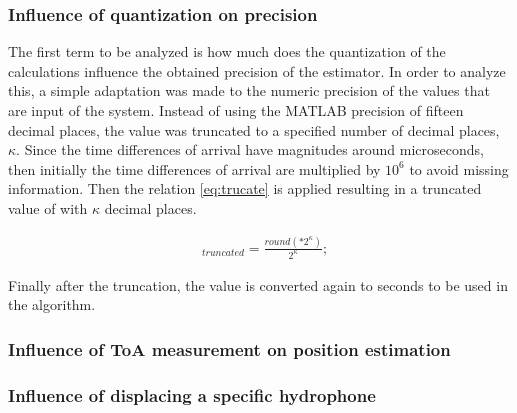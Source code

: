 \subsubsection{Influence of quantization on precision}

The first term to be analyzed is how much does the quantization of the calculations influence the obtained precision of the estimator. In order to analyze this, a simple adaptation was made to the numeric precision of the  values that are input of the system. Instead of using the MATLAB precision of fifteen decimal places, the value was truncated to a specified number of decimal places, $\kappa$.
Since the time differences of arrival have magnitudes around microseconds, then initially the time differences of arrival are multiplied by $10^6$ to avoid missing information. Then the relation \ref{eq:trucate} is applied resulting in a truncated value of  with $\kappa$ decimal places.

\begin{eqnarray}
&_{truncated} = \frac{round(*2^{\kappa})}{2^{\kappa}};
\label{eq:trucate}
\end{eqnarray}

Finally after the truncation, the value is converted again to seconds to be used in the algorithm.


\subsubsection{Influence of ToA measurement on position estimation}


\subsubsection{Influence of displacing a specific hydrophone}

